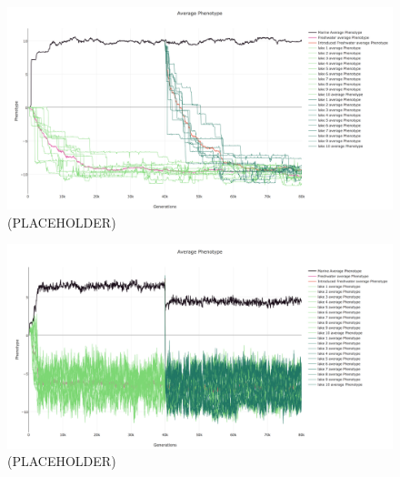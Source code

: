 \documentclass{article}
\begin{document}
\begin{figure}[h!tb]
	\begin{center}
  		\includegraphics[width=0.7\linewidth]{plotlyPlots/PhenotypeThroughout5e-5.png}
  		\caption{ (PLACEHOLDER)
		}
  		\label{fig:phenotype_ts1}
	\end{center}
\end{figure}

\begin{figure}[h!tb]
	\begin{center}
  		\includegraphics[width=0.7\linewidth]{plotlyPlots/PhenotypeThroughout5e-2.png}
  		\caption{(PLACEHOLDER)
		}
  		\label{fig:phenotype_ts4}
	\end{center}
\end{figure}
\end{document}
